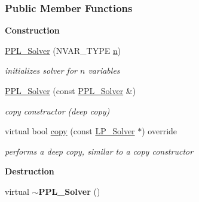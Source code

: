\subsubsection*{Public Member Functions}
\begin{Indent}\textbf{ Construction}\par
\begin{DoxyCompactItemize}
\item 
\mbox{\label{group___c_l_s_solvers_a8676ceed54fc8883fd0c2cab45e7d9a4}} 
\hyperlink{group___c_l_s_solvers_a8676ceed54fc8883fd0c2cab45e7d9a4}{P\+P\+L\+\_\+\+Solver} (N\+V\+A\+R\+\_\+\+T\+Y\+PE \hyperlink{group___c_l_s_solvers_a10d4394603a6a565a95fc65ce0f9a172}{n})
\begin{DoxyCompactList}\small\item\em initializes solver for $ n $ variables \end{DoxyCompactList}\item 
\mbox{\label{group___c_l_s_solvers_a53d5564f046f82f07f58e557228f10c5}} 
\hyperlink{group___c_l_s_solvers_a53d5564f046f82f07f58e557228f10c5}{P\+P\+L\+\_\+\+Solver} (const \hyperlink{group___c_l_s_solvers_class_l_p___solvers_1_1_p_p_l___solver}{P\+P\+L\+\_\+\+Solver} \&)
\begin{DoxyCompactList}\small\item\em copy constructor (deep copy) \end{DoxyCompactList}\item 
virtual bool \hyperlink{group___c_l_s_solvers_acc03418759754dbeda266dba9eefe98b}{copy} (const \hyperlink{group___c_l_s_solvers_class_l_p___solvers_1_1_l_p___solver}{L\+P\+\_\+\+Solver} $\ast$) override
\begin{DoxyCompactList}\small\item\em performs a deep copy, similar to a copy constructor \end{DoxyCompactList}\end{DoxyCompactItemize}
\end{Indent}
\begin{Indent}\textbf{ Destruction}\par
\begin{DoxyCompactItemize}
\item 
\mbox{\label{group___c_l_s_solvers_a2d4cd90b9e8bab2ff0fe3178bb894e75}} 
virtual {\bfseries $\sim$\+P\+P\+L\+\_\+\+Solver} ()
\end{DoxyCompactItemize}
\end{Indent}
